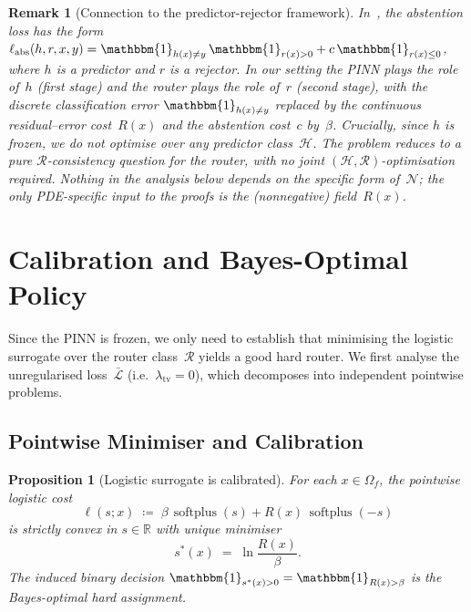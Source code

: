 \documentclass[11pt]{article}
\newtheorem{proposition}[theorem]{Proposition}
\newtheorem{remark}[theorem]{Remark}
\DeclareMathOperator{\softplus}{softplus}
\newcommand{\R}{\mathbb{R}}
\newcommand{\Lcal}{\mathcal{L}}
\newcommand{\Rcal}{\mathcal{R}}
\newcommand{\Hcal}{\mathcal{H}}
\newcommand{\Ncal}{\mathcal{N}}
\newcommand{\ind}{\mathbbm{1}}
\begin{document}
\begin{remark}[Connection to the predictor-rejector framework]\label{rem:framework}
In~\cite{mao2024predictor}, the abstention loss has the form
$\ell_{\mathrm{abs}}(h, r, x, y) = \ind_{h(x) \ne y}\,\ind_{r(x) > 0}
+ c\,\ind_{r(x) \le 0}$, where $h$ is a predictor and $r$ is a rejector.  In our
setting the PINN plays the role of~$h$ (first stage) and the router plays the role
of~$r$ (second stage), with the discrete classification error $\ind_{h(x) \ne y}$
replaced by the continuous residual--error cost~$R(x)$ and the abstention cost~$c$
by~$\beta$.  Crucially, since $h$ is \emph{frozen}, we do not optimise over any
predictor class~$\Hcal$.  The problem reduces to a pure \emph{$\Rcal$-consistency}
question for the router, with no joint $(\Hcal, \Rcal)$-optimisation required.
Nothing in the analysis below depends on the specific form of~$\Ncal$; the only
PDE-specific input to the proofs is the (nonnegative) field~$R(x)$.
\end{remark}

\section{Calibration and Bayes-Optimal Policy}
\label{sec:calibration}

Since the PINN is frozen, we only need to establish that minimising the logistic
surrogate over the router class~$\Rcal$ yields a good hard router.  We first analyse
the unregularised loss~$\bar{\Lcal}$ (i.e.\ $\lambda_{\mathrm{tv}} = 0$), which
decomposes into independent pointwise problems.

\subsection{Pointwise Minimiser and Calibration}

\begin{proposition}[Logistic surrogate is calibrated]\label{prop:calibrated}
For each $x \in \Omega_f$, the pointwise logistic cost
\begin{equation}\label{eq:ell-logistic}
  \ell(s; x) \;\coloneqq\;
    \beta\,\softplus(s) + R(x)\,\softplus(-s)
\end{equation}
is strictly convex in $s \in \R$ with unique minimiser
\begin{equation}\label{eq:s-star}
  s^*(x) \;=\; \ln\!\frac{R(x)}{\beta}.
\end{equation}
The induced binary decision $\ind_{s^*(x) > 0} = \ind_{R(x) > \beta}$ is the
Bayes-optimal hard assignment.
\end{proposition}
\end{document}
